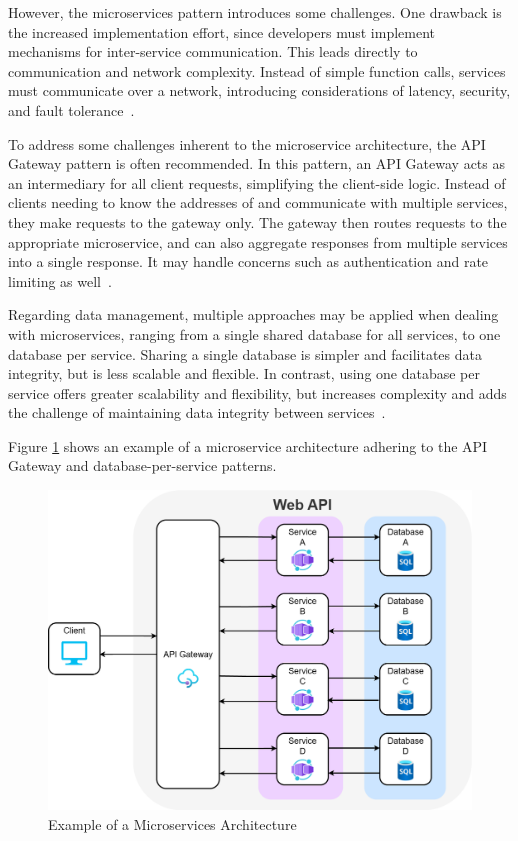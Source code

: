 \documentclass[12pt, reqno]{amsbook}
\theoremstyle{definition}
\theoremstyle{definition}
\numberwithin{section}{chapter}
\numberwithin{table}{chapter}
\numberwithin{figure}{chapter}
\begin{document}
However, the microservices pattern introduces some challenges. One drawback is the increased implementation effort, since developers must implement mechanisms for inter-service communication. This leads directly to communication and network complexity. Instead of simple function calls, services must communicate over a network, introducing considerations of latency, security, and fault tolerance~\cite{Taibi2018, Adrio2023, Khalfaoui2025, Figueira2024, Kenan2020, Villamizar2015, Yoo2025}.

To address some challenges inherent to the microservice architecture, the API Gateway pattern is often recommended. In this pattern, an API Gateway acts as an intermediary for all client requests, simplifying the client-side logic. Instead of clients needing to know the addresses of and communicate with multiple services, they make requests to the gateway only. The gateway then routes requests to the appropriate microservice, and can also aggregate responses from multiple services into a single response. It may handle concerns such as authentication and rate limiting as well~\cite{Taibi2018, Adrio2023, Khalfaoui2025, Kenan2020}.

Regarding data management, multiple approaches may be applied when dealing with microservices, ranging from a single shared database for all services, to one database per service. Sharing a single database is simpler and facilitates data integrity, but is less scalable and flexible. In contrast, using one database per service offers greater scalability and flexibility, but increases complexity and adds the challenge of maintaining data integrity between services~\cite{Taibi2018, Khalfaoui2025, Kenan2020}.

Figure \ref{Figure:Microservices_Architecture} shows an example of a microservice architecture adhering to the \ac{API} Gateway and database-per-service patterns.

\FloatBarrier
\begin{figure}[H]
  \includegraphics[width=0.9\linewidth]{images/MicroservicesArchitecture.png}
  \caption{\label{Figure:Microservices_Architecture}Example of a Microservices Architecture}
\end{figure}
\FloatBarrier
\end{document}

